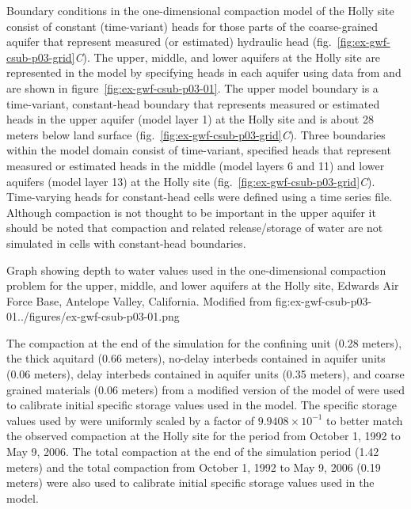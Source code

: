 Boundary conditions in the one-dimensional compaction model of the Holly site consist of constant (time-variant) heads for those parts of the coarse-grained aquifer that represent measured (or estimated) hydraulic head (fig.~\ref{fig:ex-gwf-csub-p03-grid}\textit{C}). The upper, middle, and lower aquifers at the Holly site are represented in the model by specifying heads in each aquifer using data from \cite{sneed2008} and are shown in figure~\ref{fig:ex-gwf-csub-p03-01}. The upper model boundary is a time-variant, constant-head boundary that represents measured or estimated heads in the upper aquifer (model layer 1) at the Holly site and is about 28 meters below land surface (fig.~\ref{fig:ex-gwf-csub-p03-grid}\textit{C}). Three boundaries within the model domain consist of time-variant, specified heads that represent measured or estimated heads in the middle (model layers 6 and 11) and lower aquifers (model layer 13) at the Holly site (fig.~\ref{fig:ex-gwf-csub-p03-grid}\textit{C}). Time-varying heads for constant-head cells were defined using a time series file. Although compaction is not thought to be important in the upper aquifer it should be noted that compaction and related release/storage of water are not simulated in cells with constant-head boundaries.

\begin{StandardFigure}{
                                      Graph showing depth to water values used in the one-dimensional 
                                      compaction problem for the upper, middle, and lower aquifers at the 
                                      Holly site, Edwards Air Force Base, Antelope Valley, California. Modified from \cite{sneed2008}
                                     }{fig:ex-gwf-csub-p03-01}{../figures/ex-gwf-csub-p03-01.png}
\end{StandardFigure}        

The compaction at the end of the simulation for the confining unit (0.28 meters), the thick aquitard (0.66 meters), no-delay interbeds contained in aquifer units (0.06 meters), delay interbeds contained in aquifer units (0.35 meters), and coarse grained materials  (0.06 meters) from a modified \mf version of the model of \cite{sneed2008} were used to calibrate initial specific storage values used in the model. The specific storage values used by \cite{sneed2008} were uniformly scaled by a factor of $9.9408 \times 10^{-1}$ to better match the observed compaction at the Holly site for the period from October 1, 1992 to May 9, 2006. The total compaction at the end of the simulation period (1.42 meters) and the total compaction from October 1, 1992 to May 9, 2006 (0.19 meters) were also used to calibrate initial specific storage values used in the model. 

